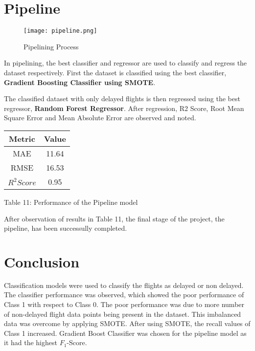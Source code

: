 \documentclass[12pt,letter-paper]{article}
\begin{document}
\section{Pipeline}

    \begin{figure}[H]%
        \begin{center}
            \texttt{[image: pipeline.png]}%
                \caption{Pipelining Process}
        \end{center}
    \end{figure}
    
    In pipelining, the best classifier and regressor are used to classify and regress the dataset respectively. First the dataset is classified using the best classifier, {\bfseries Gradient Boosting Classifier using SMOTE}. 
    
    The classified dataset with only delayed flights is then regressed using the best regressor, {\bfseries Random Forest Regressor}. After regression, R2 Score, Root Mean Square Error and Mean Absolute Error are observed and noted.

    \begin{center}
        \begin{tabular}{ |c|c|} 
         \hline
         Metric & Value\\ 
         \hline
         MAE & 11.64 \\  
         \hline
         RMSE & 16.53\\ 
         \hline
         $R^2 Score$ & 0.95\\ 
         \hline
        \end{tabular}
    \end{center}
    \begin{center}
            Table 11: Performance of the Pipeline model
    \end{center}
    
    After observation of results in Table 11, the final stage of the project, the pipeline, has been successully completed. 
\section{Conclusion}
    
    Classification models were used to classify the flights as delayed or non delayed. The classifier performance was observed, which showed the poor performance of Class 1 with respect to Class 0. The poor performance was due to more number of non-delayed flight data points being present in the dataset. This imbalanced data was overcome by applying SMOTE. After using SMOTE, the recall values of Class 1 increased. Gradient Boost Classifier was chosen for the pipeline model as it had the highest $F_1$-Score.
    
\end{document}
